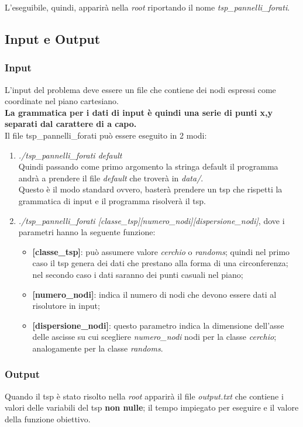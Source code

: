 \documentclass{article}
\begin{document}
L'eseguibile, quindi, apparirà nella \textit{root} riportando il nome \textit{tsp\_pannelli\_forati}.

\subsection{Input e Output}
\label{input e output}
\subsubsection{Input}
L'input del problema deve essere un file che contiene dei nodi espressi come coordinate nel piano cartesiano. \\
\textbf{La grammatica per i dati di input è quindi una serie di punti x,y separati dal carattere di a capo.} \\
Il file tsp\_pannelli\_forati può essere eseguito in 2 modi:
\begin{enumerate}[I]
\item \textit{./tsp\_pannelli\_forati default}\\
Quindi passando come primo argomento la stringa default il programma andrà a prendere il file \textit{default} che troverà in \textit{data/}.\\
Questo è il modo standard ovvero, basterà prendere un tsp che rispetti la grammatica di input e il programma risolverà il tsp.
\item \textit{./tsp\_pannelli\_forati [classe\_tsp][numero\_nodi][dispersione\_nodi]}, dove i parametri hanno la seguente funzione:
\begin{itemize}
\item \textbf{[classe\_tsp]}: può assumere valore \textit{cerchio} o \textit{randoms}; quindi nel primo caso il tsp genera dei dati che prestano alla forma di una circonferenza; nel secondo caso i dati saranno dei punti casuali nel piano;
\item \textbf{[numero\_nodi]}: indica il numero di nodi che devono essere dati al risolutore in input;
\item \textbf{[dispersione\_nodi]}: questo parametro indica la dimensione dell'asse delle ascisse su cui scegliere \textit{numero\_nodi} nodi per la classe \textit{cerchio}; analogamente per la classe \textit{randoms}. 
\end{itemize}
\end{enumerate}

\subsubsection{Output}
Quando il tsp è stato risolto nella \textit{root} apparirà il file \textit{output.txt} che contiene i valori delle variabili del tsp \textbf{non nulle}; il tempo impiegato per eseguire e il valore della funzione obiettivo.
\end{document}
